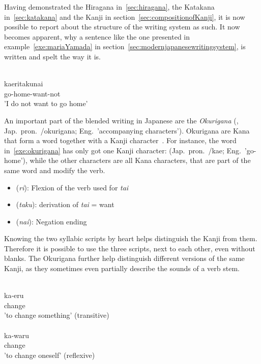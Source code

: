 Having demonstrated the Hiragana in~\ref{sec:hiragana}, the Katakana 
in~\ref{sec:katakana} and the Kanji in section~\ref{sec:compositionofKanji}, 
it is now possible to report about the structure of the writing system as such.
It now becomes apparent, why a sentence like the one presented in 
example~\ref{exe:mariaYamada} in section~\ref{sec:modernjapanesewritingsystem},
is written and spelt the way it is.
\begin{exe}
\ex\label{exe:okurigana}
\gll 
  \\
 kaeritakunai \\
 go-home-want-not \\
\trans 'I do not want to go home' \\
\end{exe}
An important part of the blended writing in Japanese are the 
\emph{Okurigana} (, Jap.\ pron.\ /okurigana; 
Eng.\ 'accompanying characters'). Okurigana are Kana that form 
a word together with a Kanji character~.
For instance, the word in~\ref{exe:okurigana} has only got one Kanji 
character:  (Jap.\ pron.\ /kae; Eng.\ 'go-home'), while the other characters are all Kana characters, that are part of the same word and modify
the verb.
\begin{itemize}
  \item {} (\emph{ri}): Flexion of the verb used for \emph{tai}
  \item {} (\emph{taku}): derivation of \emph{tai} = want
  \item {} (\emph{nai}): Negation ending
\end{itemize}
Knowing the two syllabic scripts by heart helps distinguish the Kanji from them.
Therefore it is possible to use the three scripts, next to each other, even 
without blanks. The Okurigana further help distinguish different versions of 
the same Kanji, as they sometimes even partially describe the sounds of a 
verb stem.
\begin{exe}
\ex\label{exe:stemspelling}
\begin{xlist}
\ex\label{exe:stemspellingkaeru}
\gll 
  \\
 ka-eru \\
 change \\
\trans 'to change something' (transitive) \\

\ex\label{exe:stemspellingkawaru}
\gll 
  \\
 ka-waru \\
 change \\
\trans 'to change oneself' (reflexive) \\
\end{xlist}
\end{exe}
